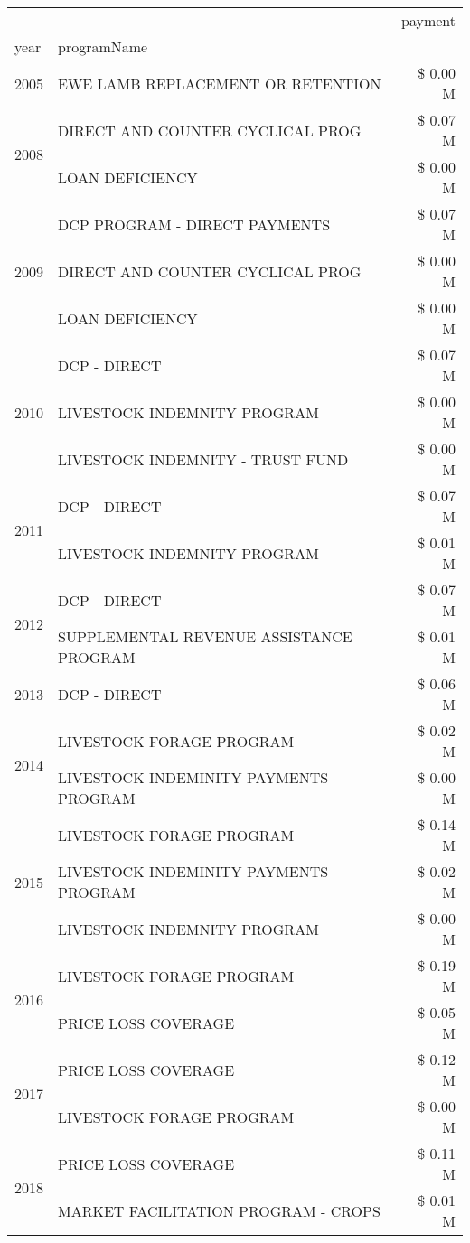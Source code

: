 \begin{tabular}{llr}
\toprule
 &  & payment \\
year & programName &  \\
\midrule
2005 & EWE LAMB REPLACEMENT OR RETENTION & \$ 0.00 M \\
\cline{1-3}
\multirow[t]{2}{*}{2008} & DIRECT AND COUNTER CYCLICAL PROG & \$ 0.07 M \\
 & LOAN DEFICIENCY & \$ 0.00 M \\
\cline{1-3}
\multirow[t]{3}{*}{2009} & DCP PROGRAM - DIRECT PAYMENTS & \$ 0.07 M \\
 & DIRECT AND COUNTER CYCLICAL PROG & \$ 0.00 M \\
 & LOAN DEFICIENCY & \$ 0.00 M \\
\cline{1-3}
\multirow[t]{3}{*}{2010} & DCP - DIRECT & \$ 0.07 M \\
 & LIVESTOCK INDEMNITY PROGRAM & \$ 0.00 M \\
 & LIVESTOCK INDEMNITY - TRUST FUND & \$ 0.00 M \\
\cline{1-3}
\multirow[t]{2}{*}{2011} & DCP - DIRECT & \$ 0.07 M \\
 & LIVESTOCK INDEMNITY PROGRAM & \$ 0.01 M \\
\cline{1-3}
\multirow[t]{2}{*}{2012} & DCP - DIRECT & \$ 0.07 M \\
 & SUPPLEMENTAL REVENUE ASSISTANCE PROGRAM & \$ 0.01 M \\
\cline{1-3}
2013 & DCP - DIRECT & \$ 0.06 M \\
\cline{1-3}
\multirow[t]{2}{*}{2014} & LIVESTOCK FORAGE PROGRAM & \$ 0.02 M \\
 & LIVESTOCK INDEMINITY PAYMENTS PROGRAM & \$ 0.00 M \\
\cline{1-3}
\multirow[t]{3}{*}{2015} & LIVESTOCK FORAGE PROGRAM & \$ 0.14 M \\
 & LIVESTOCK INDEMINITY PAYMENTS PROGRAM & \$ 0.02 M \\
 & LIVESTOCK INDEMNITY PROGRAM & \$ 0.00 M \\
\cline{1-3}
\multirow[t]{2}{*}{2016} & LIVESTOCK FORAGE PROGRAM & \$ 0.19 M \\
 & PRICE LOSS COVERAGE & \$ 0.05 M \\
\cline{1-3}
\multirow[t]{2}{*}{2017} & PRICE LOSS COVERAGE & \$ 0.12 M \\
 & LIVESTOCK FORAGE PROGRAM & \$ 0.00 M \\
\cline{1-3}
\multirow[t]{3}{*}{2018} & PRICE LOSS COVERAGE & \$ 0.11 M \\
 & MARKET FACILITATION PROGRAM - CROPS & \$ 0.01 M \\

\end{tabular}
